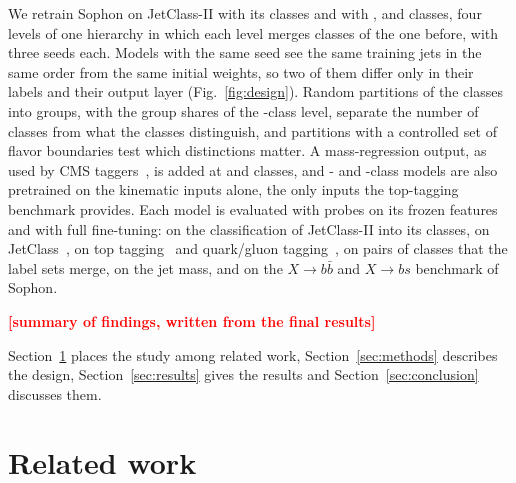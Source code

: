 \documentclass[11pt]{article}
\newcommand{\pending}[1]{\textcolor{red}{\textbf{[#1]}}}
\newcommand{\Kfull}{\VocabSizeLoneeighteight}
\newcommand{\Kres}{\VocabSizeLonesixtwo}
\newcommand{\Kmid}{\VocabSizeRfourtwoQone}
\newcommand{\Kcoarse}{\VocabSizeRonesixQone}
\begin{document}
We retrain Sophon on JetClass-II with its \Kfull{} classes and with \Kres, \Kmid{} and \Kcoarse{}
classes, four levels of one hierarchy in which each level merges classes of the one before, with
three seeds each. Models with the same seed see the same training jets in the same order from the
same initial weights, so two of them differ only in their labels and their output layer
(Fig.~\ref{fig:design}). Random partitions of the classes into \Kcoarse{} groups, with the group
shares of the \Kcoarse-class level, separate the number of classes from what the classes
distinguish, and partitions with a controlled set of flavor boundaries test which distinctions
matter. A mass-regression output, as used by CMS taggers~\cite{cmspart,glopart}, is added at \Kres{}
and \Kcoarse{} classes, and \Kfull- and \Kcoarse-class models are also pretrained on the kinematic
inputs alone, the only inputs the top-tagging benchmark provides. Each model is evaluated with
probes on its frozen features and with full fine-tuning: on the classification of JetClass-II into
its \Kfull{} classes, on JetClass~\cite{part}, on top tagging~\cite{toptag} and quark/gluon
tagging~\cite{efn}, on pairs of classes that the label sets merge, on the jet mass, and on the
$X\to b\bar b$ and $X\to bs$ benchmark of Sophon.

\pending{summary of findings, written from the final results}

Section~\ref{sec:related} places the study among related work, Section~\ref{sec:methods} describes
the design, Section~\ref{sec:results} gives the results and Section~\ref{sec:conclusion} discusses
them.

\section{Related work}\label{sec:related}
\end{document}
